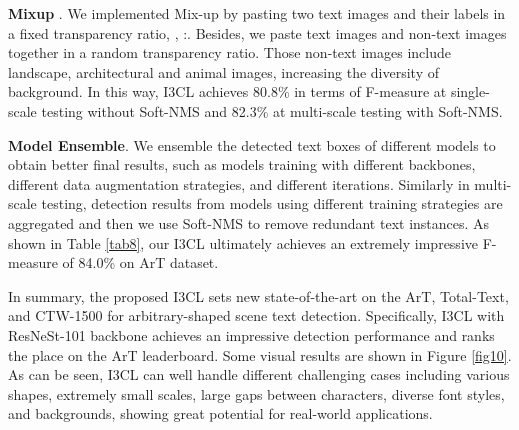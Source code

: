 \textbf{Mixup} \citep{mixup}. We implemented Mix-up by pasting two text images and their labels in a fixed transparency ratio, , :. Besides, we paste text images and non-text images together in a random transparency ratio. Those non-text images include landscape, architectural and animal images, increasing the diversity of background. In this way, I3CL achieves 80.8\% in terms of F-measure at single-scale testing without Soft-NMS and 82.3\% at multi-scale testing with Soft-NMS.

\textbf{Model Ensemble}. We ensemble the detected text boxes of different models to obtain better final results, such as models training with different backbones, different data augmentation strategies, and different iterations. Similarly in multi-scale testing, detection results from models using different training strategies are aggregated and then we use Soft-NMS to remove redundant text instances. As shown in Table \ref{tab8}, our I3CL ultimately achieves an extremely impressive F-measure of 84.0\% on ArT dataset.

In summary, the proposed I3CL sets new state-of-the-art on the ArT, Total-Text, and CTW-1500 for arbitrary-shaped scene text detection. Specifically, I3CL with ResNeSt-101 backbone achieves an impressive detection performance and ranks the  place on the ArT leaderboard. Some visual results are shown in Figure \ref{fig10}. As can be seen, I3CL can well handle different challenging cases including various shapes, extremely small scales, large gaps between characters, diverse font styles, and backgrounds, showing great potential for real-world applications.


\begin{table}[ht]\scriptsize
  \caption{Results of I3CL without SSL using different backbones on ArT dataset.  and  represent the RegionCL~\citep{regioncl} with finetuning and without finetuning on the ImageNet training data, respectively. * indicates that the whole detection model is implemented in MMDetection \citep{mmdetection}. }
  \label{tab9}
  \begin{center}
\end{center}
\end{table}

